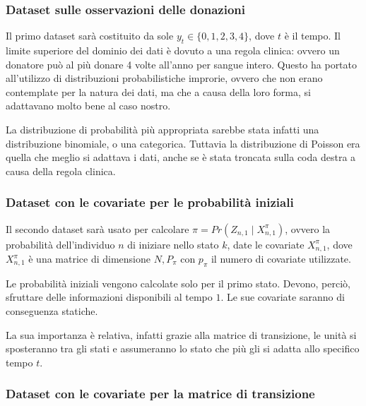 \documentclass[
  italian,
  a4paper,
  a4paper,
  twoside,
  open=right,
  12pt]{scrbook}
\theoremstyle{definition}
\theoremstyle{remark}
\begin{document}
\subsubsection{Dataset sulle osservazioni delle
donazioni}\label{dataset-sulle-osservazioni-delle-donazioni}

Il primo dataset sarà costituito da sole \(y_t \in \{0,1,2,3,4\}\), dove
\(t\) è il tempo. Il limite superiore del dominio dei dati è dovuto a
una regola clinica: ovvero un donatore può al più donare 4 volte
all'anno per sangue intero. Questo ha portato all'utilizzo di
distribuzioni probabilistiche improrie, ovvero che non erano contemplate
per la natura dei dati, ma che a causa della loro forma, si adattavano
molto bene al caso nostro.

La distribuzione di probabilità più appropriata sarebbe stata infatti
una distribuzione binomiale, o una categorica. Tuttavia la distribuzione
di Poisson era quella che meglio si adattava i dati, anche se è stata
troncata sulla coda destra a causa della regola clinica.

\subsubsection{Dataset con le covariate per le probabilità
iniziali}\label{dataset-con-le-covariate-per-le-probabilituxe0-iniziali}

Il secondo dataset sarà usato per calcolare
\(\pi = Pr(Z_{n,1} \mid X_{n,1}^{\pi})\), ovvero la probabilità
dell'individuo \(n\) di iniziare nello stato \(k\), date le covariate
\(X_{n,1}^{\pi}\), dove \(X_{n,1}^{\pi}\) è una matrice di dimensione
\(N, P_\pi\) con \(p_\pi\) il numero di covariate utilizzate.

Le probabilità iniziali vengono calcolate solo per il primo stato.
Devono, perciò, sfruttare delle informazioni disponibili al tempo \(1\).
Le sue covariate saranno di conseguenza statiche.

La sua importanza è relativa, infatti grazie alla matrice di
transizione, le unità si sposteranno tra gli stati e assumeranno lo
stato che più gli si adatta allo specifico tempo \(t\).

\subsubsection{Dataset con le covariate per la matrice di
transizione}\label{dataset-con-le-covariate-per-la-matrice-di-transizione}
\end{document}
